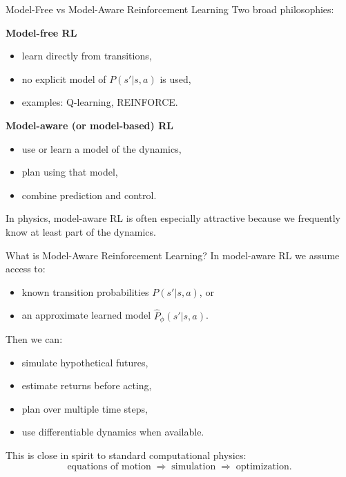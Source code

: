 \documentclass{beamer}
\begin{document}
\begin{frame}{Model-Free vs Model-Aware Reinforcement Learning}
  Two broad philosophies:

  \textbf{Model-free RL}
  \begin{itemize}
  \item learn directly from transitions,
  \item no explicit model of $P(s'|s,a)$ is used,
  \item examples: Q-learning, REINFORCE.
  \end{itemize}

  \textbf{Model-aware (or model-based) RL}
  \begin{itemize}
  \item use or learn a model of the dynamics,
  \item plan using that model,
  \item combine prediction and control.
  \end{itemize}

  In physics, model-aware RL is often especially attractive because we frequently know at least part of the dynamics.
\end{frame}

\begin{frame}{What is Model-Aware Reinforcement Learning?}
  In model-aware RL we assume access to:
  \begin{itemize}
  \item known transition probabilities $P(s'|s,a)$, or
  \item an approximate learned model $\hat P_\phi(s'|s,a)$.
  \end{itemize}

  Then we can:
  \begin{itemize}
  \item simulate hypothetical futures,
  \item estimate returns before acting,
  \item plan over multiple time steps,
  \item use differentiable dynamics when available.
  \end{itemize}

  This is close in spirit to standard computational physics:
  \[
  \text{equations of motion} \;\Rightarrow\; \text{simulation} \;\Rightarrow\; \text{optimization}.
  \]
\end{frame}
\end{document}
